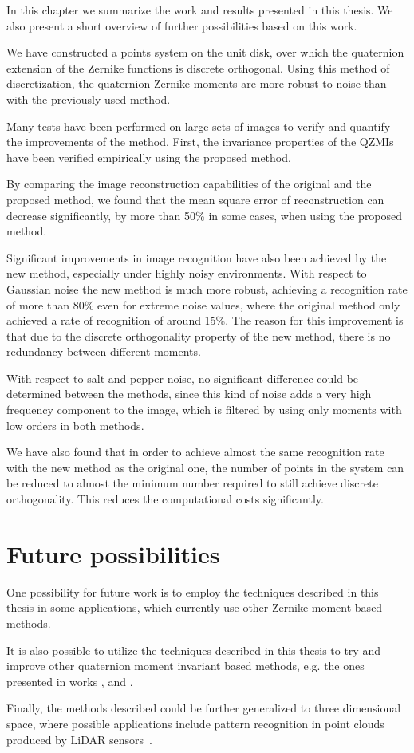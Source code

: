 In this chapter we summarize the work and results presented in this thesis. We also present a short overview of further possibilities based on this work.

We have constructed a points system on the unit disk, over which the quaternion extension of the Zernike functions is discrete orthogonal. Using this method of discretization, the quaternion Zernike moments are more robust to noise than with the previously used method.

Many tests have been performed on large sets of images to verify and quantify the improvements of the method.
First, the invariance properties of the QZMIs have been verified empirically using the proposed method.

By comparing the image reconstruction capabilities of the original and the proposed method, we found that the mean square error of reconstruction can decrease significantly, by more than 50\% in some cases, when using the proposed method.

Significant improvements in image recognition have also been achieved by the new method, especially under highly noisy environments. With respect to Gaussian noise the new method is much more robust, achieving a recognition rate of more than 80\% even for extreme noise values, where the original method only achieved a rate of recognition of around 15\%. The reason for this improvement is that due to the discrete orthogonality property of the new method, there is no redundancy between different moments.

With respect to salt-and-pepper noise, no significant difference could be determined between the methods, since this kind of noise adds a very high frequency component to the image, which is filtered by using only moments with low orders in both methods.

We have also found that in order to achieve almost the same recognition rate with the new method as the original one, the number of points in the system can be reduced to almost the minimum number required to still achieve discrete orthogonality. This reduces the computational costs significantly. 

\section{Future possibilities}
One possibility for future work is to employ the techniques described in this thesis in some applications, which currently use other Zernike moment based methods.

It is also possible to utilize the techniques described in this thesis to try and improve other quaternion moment invariant based methods, e.g. the ones presented in works \cite{chebyshev-fourier}, \cite{Yang,Wang,Singh} and \cite{HosnyLegendre,HosnyChebyshev,WangAcc,LiuAcc}.

Finally, the methods described could be further generalized to three dimensional space, where possible applications include pattern recognition in point clouds produced by LiDAR sensors~\cite{zernike_lidar}.
